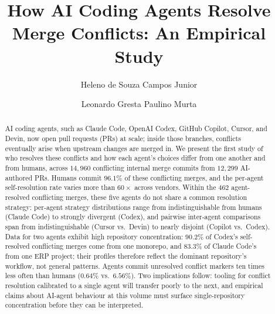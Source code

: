 \documentclass[sigconf,anonymous]{acmart}
\begin{document}
\title{How AI Coding Agents Resolve Merge Conflicts: An Empirical Study}

\author{Heleno de Souza Campos Junior}

\author{Leonardo Gresta Paulino Murta}

\renewcommand{\shortauthors}{Campos Junior and Murta}
\renewcommand{\shorttitle}{How AI Coding Agents Resolve Merge Conflicts?}

\begin{abstract}
AI coding agents, such as Claude Code, OpenAI Codex, GitHub Copilot, Cursor, and Devin, now open pull requests (PRs) at scale; inside those branches, conflicts eventually arise when upstream changes are merged in. We present the first study of who resolves these conflicts and how each agent's choices differ from one another and from humans, across $14{,}960$ conflicting internal merge commits from $12{,}299$ AI-authored PRs. Humans commit $96.1\%$ of these conflicting merges, and the per-agent self-resolution rate varies more than $60{\times}$ across vendors. Within the $462$ agent-resolved conflicting merges, these five agents do not share a common resolution strategy: per-agent strategy distributions range from indistinguishable from humans (Claude Code) to strongly divergent (Codex), and pairwise inter-agent comparisons span from indistinguishable (Cursor vs.\ Devin) to nearly disjoint (Copilot vs.\ Codex). Data for two agents exhibit high repository concentration: $90.2\%$ of Codex's self-resolved conflicting merges come from one monorepo, and $83.3\%$ of Claude Code's from one ERP project; their profiles therefore reflect the dominant repository's workflow, not general patterns. Agents commit unresolved conflict markers ten times less often than humans ($0.64\%$ vs.\ $6.56\%$). Two implications follow: tooling for conflict resolution calibrated to a single agent will transfer poorly to the next, and empirical claims about AI-agent behaviour at this volume must surface single-repository concentration before they can be interpreted.
\end{abstract}
\end{document}
